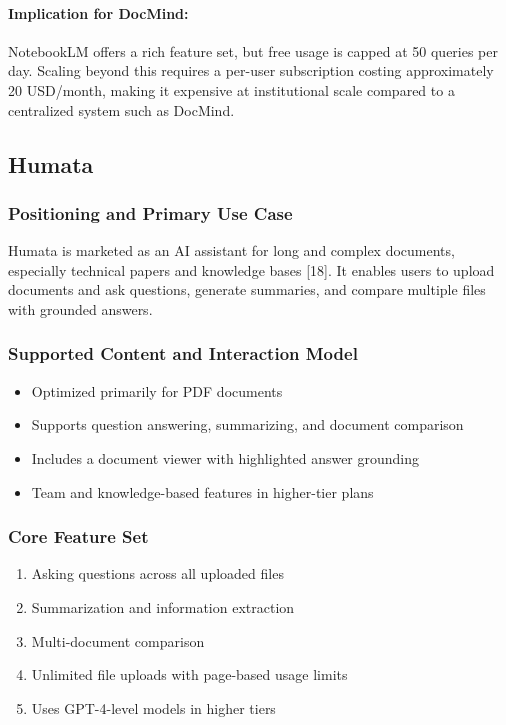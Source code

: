\documentclass[12pt, a4paper, oneside]{report}
\let\oldsubsection\subsection
\renewcommand{\subsection}{%
  \addtocontents{toc}{\protect\needspace{3\baselineskip}}%
  \oldsubsection
}
\begin{document}
\paragraph{Implication for DocMind:}

NotebookLM offers a rich feature set, but free usage is capped at 50 queries per day. Scaling beyond this requires a per-user subscription costing approximately 20 USD/month, making it expensive at institutional scale compared to a centralized system such as DocMind.

\newpage

\subsection{Humata}

\subsubsection{Positioning and Primary Use Case}

Humata is marketed as an AI assistant for long and complex documents, especially technical papers and knowledge bases [18]. It enables users to upload documents and ask questions, generate summaries, and compare multiple files with grounded answers.

\subsubsection{Supported Content and Interaction Model}

\begin{itemize}[noitemsep]
  \item Optimized primarily for PDF documents
  \item Supports question answering, summarizing, and document comparison
  \item Includes a document viewer with highlighted answer grounding
  \item Team and knowledge-based features in higher-tier plans
\end{itemize}

\subsubsection{Core Feature Set}

\begin{enumerate}[noitemsep]
  \item Asking questions across all uploaded files
  \item Summarization and information extraction
  \item Multi-document comparison
  \item Unlimited file uploads with page-based usage limits
  \item Uses GPT-4-level models in higher tiers
\end{enumerate}
\end{document}
